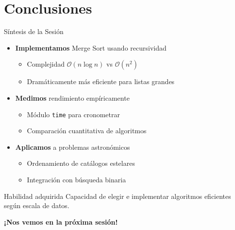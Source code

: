 \documentclass[10pt]{beamer}
\begin{document}
\section{Conclusiones}

\begin{frame}{Síntesis de la Sesión}
  \begin{itemize}
    \item \textbf{Implementamos} Merge Sort usando recursividad
      \begin{itemize}
        \item Complejidad $\mathcal{O}(n \log n)$ vs $\mathcal{O}(n^2)$
        \item Dramáticamente más eficiente para listas grandes
      \end{itemize}
    \item \textbf{Medimos} rendimiento empíricamente
      \begin{itemize}
        \item Módulo \texttt{time} para cronometrar
        \item Comparación cuantitativa de algoritmos
      \end{itemize}
    \item \textbf{Aplicamos} a problemas astronómicos
      \begin{itemize}
        \item Ordenamiento de catálogos estelares
        \item Integración con búsqueda binaria
      \end{itemize}
  \end{itemize}
  
  \begin{block}{Habilidad adquirida}
    Capacidad de elegir e implementar algoritmos eficientes según escala de datos.
  \end{block}
\end{frame}

\begin{frame}
  \begin{center}
    \textbf{¡Nos vemos en la próxima sesión!}
  \end{center}
\end{frame}
\end{document}
